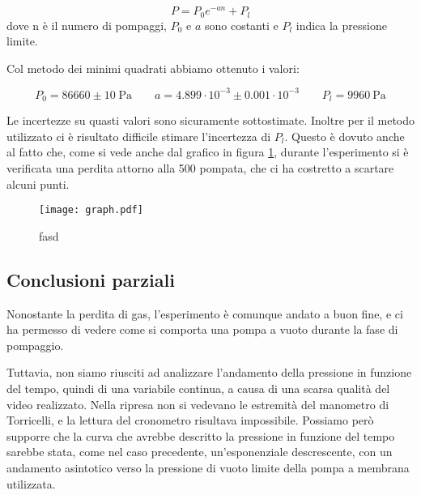 \begin{equation}
    P = P_0 e^{-an} + P_l
\end{equation}
%
dove n è il numero di pompaggi, $P_0$ e $a$ sono costanti e $P_l$ indica la pressione limite.

Col metodo dei minimi quadrati abbiamo ottenuto i valori:

\begin{equation}
    P_0 = 86660 \pm 10 \; \si{\pascal} \qquad a = 4.899 \cdot 10^{-3} \pm 0.001 \cdot 10^{-3} \qquad P_l = \SI{9960}{\pascal}
\end{equation}

Le incertezze su quasti valori sono sicuramente sottostimate. Inoltre per il metodo utilizzato ci è risultato difficile
stimare l'incertezza di $P_l$. Questo è dovuto anche al fatto che, come si vede anche dal grafico in figura \ref{fig:graph1},
durante l'esperimento si è verificata una perdita attorno alla 500 pompata, che ci ha costretto a scartare alcuni punti.

\begin{figure}
    \texttt{[image: graph.pdf]}
    \caption{fasd}
    \label{fig:graph1}
\end{figure}



\subsection{Conclusioni parziali}

Nonostante la perdita di gas, l'esperimento è comunque andato a buon fine, e ci ha permesso di vedere come si comporta
una pompa a vuoto durante la fase di pompaggio.

Tuttavia, non siamo riusciti ad analizzare l'andamento della pressione in funzione del tempo, quindi di una variabile continua, a causa di una scarsa qualità del video realizzato. Nella ripresa non si vedevano le estremità del manometro di Torricelli, e la lettura del cronometro risultava impossibile. Possiamo però supporre che la curva che avrebbe descritto la pressione in funzione del tempo sarebbe stata, come nel caso precedente, un'esponenziale descrescente, con un andamento asintotico verso la pressione di vuoto limite della pompa a membrana utilizzata.
